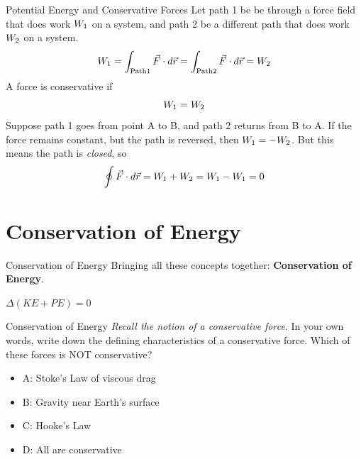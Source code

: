\documentclass{beamer}
\begin{document}
\begin{frame}{Potential Energy and Conservative Forces}
Let path 1 be be through a force field that does work $W_{\rm 1}$ on a system, and path 2 be a different path that does work $W_{\rm 2}$ on a system.
\begin{equation}
W_{\rm 1} = \int_{\rm Path 1} \vec{F}\cdot d\vec{r} = \int_{\rm Path 2} \vec{F} \cdot d\vec{r} = W_{\rm 2}
\end{equation}
A force is conservative if 
\begin{equation}
W_{\rm 1} = W_{\rm 2}
\end{equation}
Suppose path 1 goes from point A to B, and path 2 returns from B to A.  If the force remains constant, but the path is reversed, then $W_{\rm 1} = -W_{\rm 2}$.  But this means the path is \textit{closed}, so 
\begin{equation}
\oint \vec{F} \cdot d\vec{r} = W_{\rm 1} + W_{\rm 2} = W_{\rm 1} - W_{\rm 1} = 0
\label{eq:work}
\end{equation}
\end{frame}

\section{Conservation of Energy}

\begin{frame}{Conservation of Energy}
Bringing all these concepts together: \alert{\textbf{Conservation of Energy}}. \\ \vspace{1cm}
\begin{tcolorbox}[colback=white,colframe=red!40!blue,title=Conservation of Energy]
\alert{$\Delta (KE + PE) = 0$}
\end{tcolorbox}
\end{frame}

\begin{frame}{Conservation of Energy}
\textit{Recall the notion of a conservative force}.  In your own words, write down the defining characteristics of a conservative force.  Which of these forces is NOT conservative?
\begin{itemize}
\item A: Stoke's Law of viscous drag
\item B: Gravity near Earth's surface
\item C: Hooke's Law
\item D: All are conservative
\end{itemize}
\end{frame}
\end{document}

